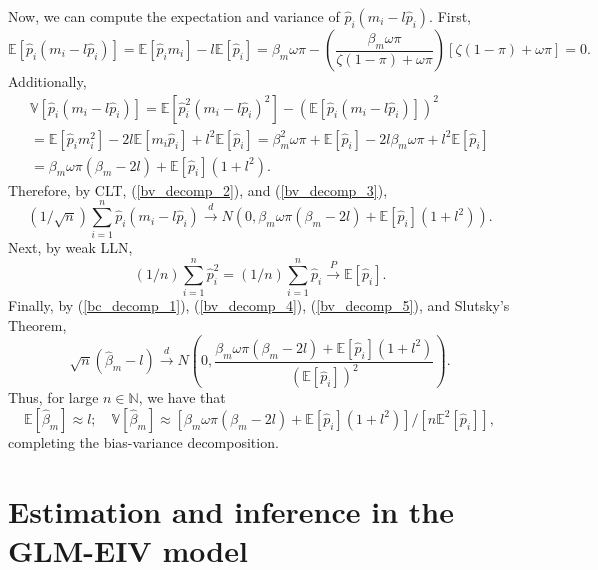 \documentclass[12pt]{article}
\begin{document}
\begin{appendices}
\begin{refsection}
		Now, we can compute the expectation and variance of $\hat{p}_i(m_i - l\hat{p}_i)$. First,
		\begin{equation}\label{bv_decomp_2}
		\mathbb{E}\left[\hat{p}_i(m_i - l\hat{p}_i) \right] = \mathbb{E}[\hat{p}_i m_i] - l \mathbb{E}[\hat{p}_i] = \beta_m \omega \pi - \left(\frac{\beta_m \omega \pi}{\zeta (1-\pi) + \omega \pi}\right)[\zeta (1-\pi) + \omega \pi] = 0.
		\end{equation}
		Additionally,
		\begin{multline}\label{bv_decomp_3}
		\mathbb{V}\left[\hat{p}_i(m_i - l\hat{p}_i)\right] = \mathbb{E}\left[\hat{p}_i^2(m_i - l\hat{p}_i)^2\right] - (\mathbb{E}\left[ \hat{p}_i(m_i - l\hat{p}_i)\right])^2 \\ = \mathbb{E}\left[ \hat{p}_i m_i^2\right] - 2l \mathbb{E}[m_i\hat{p}_i] +l^2 \mathbb{E}[\hat{p}_i]= \beta^2_m \omega \pi + \mathbb{E}[ \hat{p}_i] -2l \beta_m \omega \pi + l^2 \mathbb{E}[\hat{p}_i] \\ = \beta_m\omega\pi(\beta_m - 2l) + \mathbb{E}[\hat{p}_i](1 + l^2).
		\end{multline}
		Therefore, by CLT, (\ref{bv_decomp_2}), and (\ref{bv_decomp_3}),
		\begin{equation}\label{bv_decomp_4}
		(1/\sqrt{n})\sum_{i=1}^n \hat{p}_i(m_i - l \hat{p}_i) \xrightarrow{d} N\left(0, \beta_m\omega\pi(\beta_m - 2l) + \mathbb{E}[\hat{p}_i](1 + l^2) \right).
		\end{equation}
		Next, by weak LLN,
		\begin{equation}\label{bv_decomp_5}
		(1/n) \sum_{i=1}^n \hat{p}_i^2 = (1/n) \sum_{i=1}^n \hat{p}_i \xrightarrow{P} \mathbb{E}[\hat{p}_i].
		\end{equation}
		Finally, by (\ref{bc_decomp_1}), (\ref{bv_decomp_4}), (\ref{bv_decomp_5}), and Slutsky's Theorem,
		$$ \sqrt{n}(\hat{\beta}_m - l) \xrightarrow{d} N\left(0, \frac{ \beta_m\omega\pi(\beta_m - 2l) + \mathbb{E}[\hat{p}_i](1 + l^2) }{\left(\mathbb{E}[\hat{p}_i]\right)^2} \right).$$ Thus, for large $n \in \mathbb{N}$, we have that 
		$$
		\mathbb{E} [\hat{\beta}_m] \approx l; \quad
		\mathbb{V}[\hat{\beta}_m] \approx \left[\beta_m\omega\pi(\beta_m - 2l) + \mathbb{E}[\hat{p}_i](1 + l^2)\right]/[n\mathbb{E}^2[\hat{p}_i]],$$
		completing the bias-variance decomposition.
		
		\section{Estimation and inference in the GLM-EIV model}\label{sec:glmeiv_details}

\end{refsection}
\end{appendices}
\end{document}
